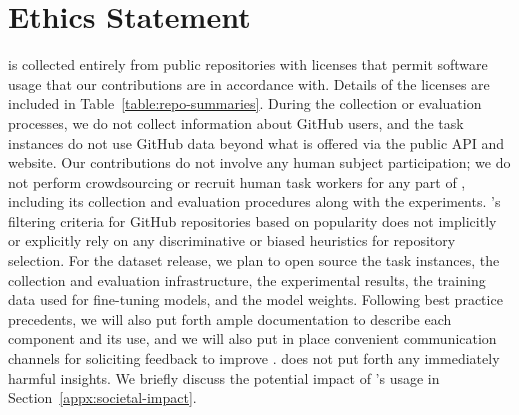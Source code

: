 \section{Ethics Statement}
\label{sec:ethics-statement}

\benchmark{} is collected entirely from public repositories with licenses that permit software usage that our contributions are in accordance with.
Details of the licenses are included in Table~\ref{table:repo-summaries}.
During the collection or evaluation processes, we do not collect information about GitHub users, and the \benchmark{} task instances do not use GitHub data beyond what is offered via the public API and website.
Our contributions do not involve any human subject participation; we do not perform crowdsourcing or recruit human task workers for any part of \benchmark{}, including its collection and evaluation procedures along with the experiments.
\benchmark{}'s filtering criteria for GitHub repositories based on popularity does not implicitly or explicitly rely on any discriminative or biased heuristics for repository selection.
For the dataset release, we plan to open source the \benchmark{} task instances, the collection and evaluation infrastructure, the experimental results, the training data used for fine-tuning \swellama{} models, and the \swellama{} model weights.
Following best practice precedents, we will also put forth ample documentation to describe each component and its use, and we will also put in place convenient communication channels for soliciting feedback to improve \benchmark{}.
\benchmark{} does not put forth any immediately harmful insights.
We briefly discuss the potential impact of \benchmark{}'s usage in Section~\ref{appx:societal-impact}.

